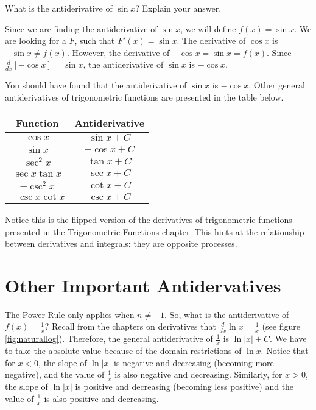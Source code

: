 \begin{Exercise}[label=triganti]
What is the antiderivative of $\sin{x}$? Explain your answer. 
\end{Exercise}

\begin{Answer}[ref=triganti]
Since we are finding the antiderivative of $\sin{x}$, we will define 
$f(x) = \sin{x}$. We are looking for a $F$, such that $F'(x) = \sin{x}$. 
The derivative of $\cos{x}$ is $-\sin{x} \neq f(x)$. However, the derivative 
of $-\cos{x} = \sin{x} = f(x)$. Since $\frac{d}{dx} [-\cos{x}] = 
\sin{x}$, the antiderivative of $\sin{x}$ is $-\cos{x}$. 
\end{Answer}

You should have found that the antiderivative of $\sin{x}$ is 
$-\cos{x}$. Other general antiderivatives of trigonometric functions 
are presented in the table below. 

\begin{center}
	\begin{tabular}{|c|c|}\hline
		Function & Antiderivative\\
		\hline
		$\cos{x}$ & $\sin{x} + C$\\
		\hline
		$\sin{x}$ & $-\cos{x} + C$\\
		\hline
		$\sec^2{x}$ & $\tan{x} + C$\\
		\hline
		$\sec{x} \tan{x}$ & $\sec{x} + C$\\
		\hline
		$-\csc^2{x}$ & $\cot{x} + C$\\
		\hline
		$-\csc{x} \cot{x}$ & $\csc{x} + C$\\
		\hline
	\end{tabular}
\end{center}


Notice this is the flipped version of the derivatives of trigonometric 
functions presented in the Trigonometric Functions chapter. This hints 
at the relationship between derivatives and integrals: they are 
opposite processes. 

\section{Other Important Antidervatives}

The Power Rule only applies when $n\neq-1$. So, what is the 
antiderivative of $f(x) = \frac{1}{x}$? Recall from the chapters on 
derivatives that $\frac{d}{dx} \ln{x} = \frac{1}{x}$ (see figure 
\ref{fig:naturallog}). Therefore, the general antiderivative of 
$\frac{1}{x}$ is $\ln{|x|} + C$. We have to take the absolute value 
because of the domain restrictions of $\ln{x}$. Notice that for $x<0$, 
the slope of $\ln{|x|}$ is negative and decreasing (becoming more 
negative), and the value of $\frac{1}{x}$ is also negative and 
decreasing. Similarly, for $x>0$, the slope of $\ln{|x|}$ is positive 
and decreasing (becoming less positive) and the value of $\frac{1}{x}$ 
is also positive and decreasing. 

